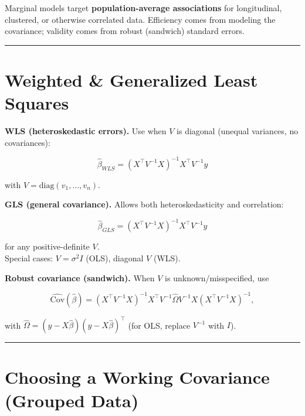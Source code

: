 \documentclass[
  letterpaper,
  DIV=11,
  numbers=noendperiod]{scrreprt}
\begin{document}
\markboth{\textcolor{purple}{Marginal Models}}{\textcolor{purple}{Marginal Models}}

Marginal models target \textbf{population-average associations} for
longitudinal, clustered, or otherwise correlated data. Efficiency comes
from modeling the covariance; validity comes from robust (sandwich)
standard errors.

\begin{center}\rule{0.5\linewidth}{0.5pt}\end{center}

\hypertarget{weighted-generalized-least-squares}{%
\section*{Weighted \& Generalized Least
Squares}\label{weighted-generalized-least-squares}}


\textbf{WLS (heteroskedastic errors).} Use when \(V\) is diagonal
(unequal variances, no covariances):

\[
\hat\beta_{WLS}=(X^\top V^{-1}X)^{-1}X^\top V^{-1}y
\]

with \(V=\mathrm{diag}(v_1,\dots,v_n)\).

\textbf{GLS (general covariance).} Allows both heteroskedasticity and
correlation:

\[
\hat\beta_{GLS}=(X^\top V^{-1}X)^{-1}X^\top V^{-1}y
\]

for any positive-definite \(V\).\\
Special cases: \(V=\sigma^2 I\) (OLS), diagonal \(V\) (WLS).

\textbf{Robust covariance (sandwich).} When \(V\) is
unknown/misspecified, use

\[
\widehat{\mathrm{Cov}}(\hat\beta)=(X^\top V^{-1}X)^{-1} X^\top V^{-1} \hat\Omega V^{-1} X (X^\top V^{-1}X)^{-1},
\]

with \(\hat\Omega=(y-X\hat\beta)(y-X\hat\beta)^\top\) (for OLS, replace
\(V^{-1}\) with \(I\)).

\begin{center}\rule{0.5\linewidth}{0.5pt}\end{center}

\hypertarget{choosing-a-working-covariance-grouped-data}{%
\section*{Choosing a Working Covariance (Grouped
Data)}\label{choosing-a-working-covariance-grouped-data}}
\end{document}
